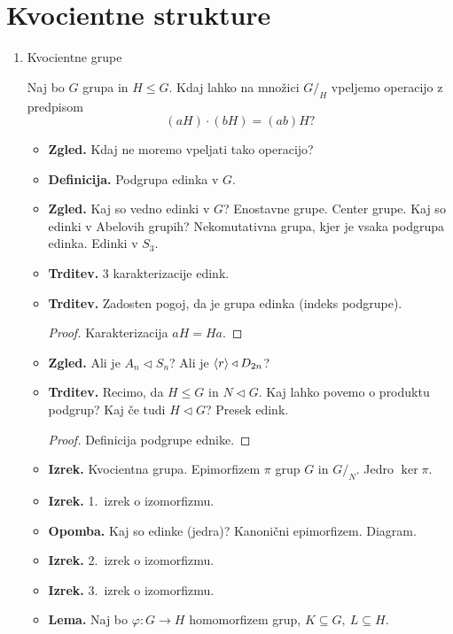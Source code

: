 \section{Kvocientne strukture}

\begin{enumerate}
    \item Kvocientne grupe
    
    Naj bo \(G\) grupa in \(H \leq G\). Kdaj lahko na množici \(G/_H\) vpeljemo operacijo z predpisom 
    \[(aH) \cdot (bH) = (ab)H?\]
    \begin{itemize}
        \item \textbf{Zgled.} Kdaj ne moremo vpeljati tako operacijo?
        \item \textbf{Definicija.} Podgrupa edinka v \(G\).
        \item \textbf{Zgled.} Kaj so vedno edinki v \(G\)? Enostavne grupe. Center grupe. Kaj so edinki v Abelovih grupih? Nekomutativna grupa, kjer je vsaka podgrupa edinka. Edinki v \(S_3\).
        \item \textbf{Trditev.} 3 karakterizacije edink. 
        \item \textbf{Trditev.} Zadosten pogoj, da je grupa edinka (indeks podgrupe).
        \begin{proof}
            Karakterizacija \(aH = Ha\).
        \end{proof}
        \item \textbf{Zgled.} Ali je \(A_n \triangleleft S_n\)? Ali je \(\langle {r} \rangle \triangleleft D_{2n}\)?
        \item \textbf{Trditev.} Recimo, da \(H \leq G\) in \(N \triangleleft G\). Kaj lahko povemo o produktu podgrup? Kaj če tudi \(H \triangleleft G\)? Presek edink.
        \begin{proof}
            Definicija podgrupe ednike.
        \end{proof}
        \item \textbf{Izrek.} Kvocientna grupa. Epimorfizem \(\pi\) grup \(G\) in \(G/_N\). Jedro \(\ker \pi\).
        \item \textbf{Izrek.} 1.\ izrek o izomorfizmu. \todo{*}
        \item \textbf{Opomba.} Kaj so edinke (jedra)? Kanonični epimorfizem. Diagram.
        \item \textbf{Izrek.} 2.\ izrek o izomorfizmu.
        \item \textbf{Izrek.} 3.\ izrek o izomorfizmu.
        \item \textbf{Lema.} Naj bo \(\varphi: G \to H\) homomorfizem grup, \(K \subseteq G, \ L \subseteq H\).

\end{itemize}
\end{enumerate}
